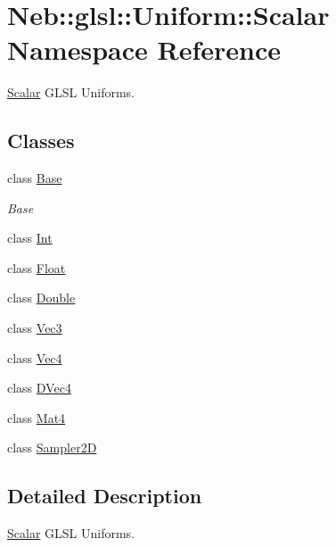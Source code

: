 \hypertarget{namespaceNeb_1_1glsl_1_1Uniform_1_1Scalar}{\section{Neb\-:\-:glsl\-:\-:Uniform\-:\-:Scalar Namespace Reference}
\label{namespaceNeb_1_1glsl_1_1Uniform_1_1Scalar}
}


\hyperlink{namespaceNeb_1_1glsl_1_1Uniform_1_1Scalar}{Scalar} G\-L\-S\-L Uniforms.  


\subsection*{Classes}
\begin{DoxyCompactItemize}
\item 
class \hyperlink{classNeb_1_1glsl_1_1Uniform_1_1Scalar_1_1Base}{Base}
\begin{DoxyCompactList}\small\item\em Base \end{DoxyCompactList}\item 
class \hyperlink{classNeb_1_1glsl_1_1Uniform_1_1Scalar_1_1Int}{Int}
\item 
class \hyperlink{classNeb_1_1glsl_1_1Uniform_1_1Scalar_1_1Float}{Float}
\item 
class \hyperlink{classNeb_1_1glsl_1_1Uniform_1_1Scalar_1_1Double}{Double}
\item 
class \hyperlink{classNeb_1_1glsl_1_1Uniform_1_1Scalar_1_1Vec3}{Vec3}
\item 
class \hyperlink{classNeb_1_1glsl_1_1Uniform_1_1Scalar_1_1Vec4}{Vec4}
\item 
class \hyperlink{classNeb_1_1glsl_1_1Uniform_1_1Scalar_1_1DVec4}{D\-Vec4}
\item 
class \hyperlink{classNeb_1_1glsl_1_1Uniform_1_1Scalar_1_1Mat4}{Mat4}
\item 
class \hyperlink{classNeb_1_1glsl_1_1Uniform_1_1Scalar_1_1Sampler2D}{Sampler2\-D}
\end{DoxyCompactItemize}


\subsection{Detailed Description}
\hyperlink{namespaceNeb_1_1glsl_1_1Uniform_1_1Scalar}{Scalar} G\-L\-S\-L Uniforms. 